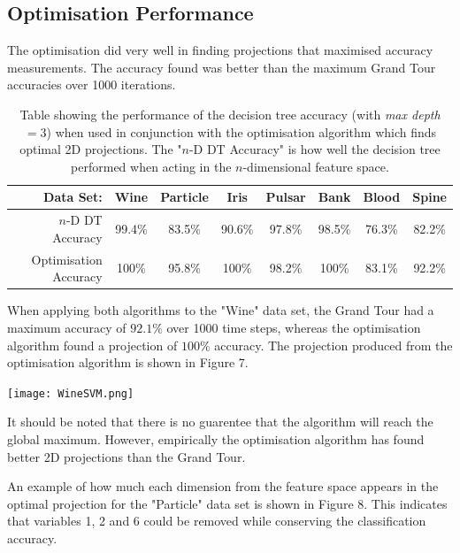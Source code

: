 \documentclass[a4paper,11pt,twoside]{article}
\begin{document}
\subsection{Optimisation Performance}
The optimisation did very well in finding projections that maximised accuracy measurements. The accuracy found was better than the maximum Grand Tour accuracies over 1000 iterations.
\begin{table}[h]
\caption{Table showing the performance of the decision tree accuracy (with \textit{max depth }$=3$) when used in conjunction with the optimisation algorithm which finds optimal 2D projections. The "$n$-D DT Accuracy" is how well the decision tree performed when acting in the $n$-dimensional feature space.}
\begin{tabular}{|r|c|c|c|c|c|c|c|}
\hline
Data Set:             & Wine   & Particle & Iris   & Pulsar & Bank   & Blood  & Spine  \\ \hline
$n$-D DT Accuracy       & 99.4\% & 83.5\%   & 90.6\% & 97.8\% & 98.5\% & 76.3\% & 82.2\% \\ \hline
Optimisation Accuracy & 100\%  & 95.8\%   & 100\%  & 98.2\% & 100\%  & 83.1\% & 92.2\% \\ \hline
\end{tabular}
\end{table}

When applying both algorithms to the "Wine" data set, the Grand Tour had a maximum accuracy of $92.1\%$ over 1000 time steps, whereas the optimisation algorithm found a projection of $100\%$ accuracy. The projection produced from the optimisation algorithm is shown in Figure 7.

\begin{center}
\texttt{[image: WineSVM.png]}

\end{center}

It should be noted that there is no guarentee that the algorithm will reach the global maximum. However, empirically the optimisation algorithm has found better 2D projections than the Grand Tour.
\newline

An example of how much each dimension from the feature space appears in the optimal projection for the "Particle" data set is shown in Figure 8. This indicates that variables 1, 2 and 6 could be removed while conserving the classification accuracy.
\end{document}
